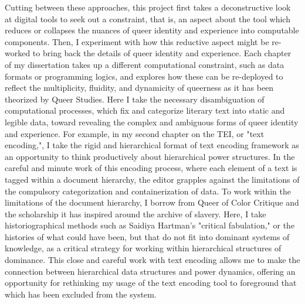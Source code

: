 \documentclass[11pt]{article}
\begin{document}
Cutting between these approaches, this project first takes a
deconstructive look at digital tools to seek out a constraint, that
is, an aspect about the tool which reduces or collapses the nuances of
queer identity and experience into computable components. Then, I
experiment with how this reductive aspect might be re-worked to bring
back the details of queer identity and experience. Each chapter of my
dissertation takes up a different computational constraint, such as
data formats or programming logics, and explores how these can be
re-deployed to reflect the multiplicity, fluidity, and dynamicity of
queerness as it has been theorized by Queer Studies. Here I take the
necessary disambiguation of computational processes, which fix and
categorize literary text into static and legible data, toward
revealing the complex and ambiguous forms of queer identity and
experience. For example, in my second chapter on the TEI, or "text
encoding,", I take the rigid and hierarchical format of text encoding
framework as an opportunity to think productively about hierarchical
power structures.  In the careful and minute work of this encoding
process, where each element of a text is tagged within a document
hierarchy, the editor grapples against the limitations of the
compulsory categorization and containerization of data. To work within
the limitations of the document hierarchy, I borrow from Queer of
Color Critique and the scholarship it has inspired around the archive
of slavery. Here, I take historiographical methods such as Saidiya
Hartman’s "critical fabulation," or the histories of what could have
been, but that do not fit into dominant systems of knowledge, as a
critical strategy for working within hierarchical structures of
dominance. This close and careful work with text encoding allows me to
make the connection between hierarchical data structures and power
dynamics, offering an opportunity for rethinking my usage of the text
encoding tool to foreground that which has been excluded from the
system.
\end{document}
